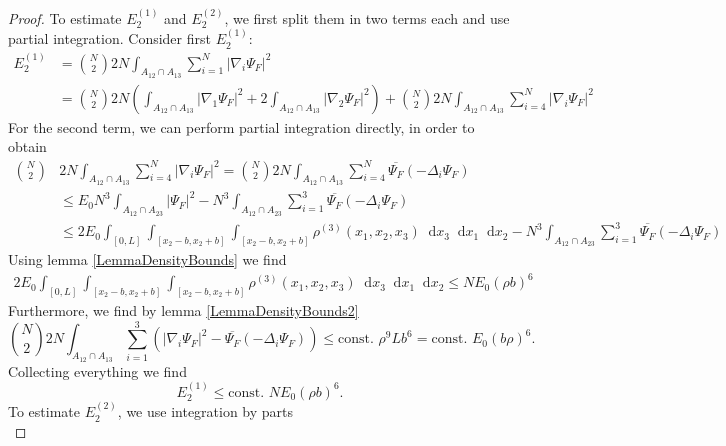 \documentclass[a4paper,11pt]{article}
\newcommand{\abs}[1]{\left\lvert #1 \right\rvert}
\newcommand*\diff{\mathop{}\!\mathrm{d}}
\numberwithin{equation}{section}
\begin{document}
		\begin{proof}
		To estimate $ E_2^{(1)} $ and $ E_2^{(2)} $, we first split them in two terms each and use partial integration. Consider first $ E_2^{(1)} $: 
		\begin{equation}
		\begin{aligned}
		E_2^{(1)}&=\binom{N}{2}2N\int_{A_{12}\cap A_{13}}\sum_{i=1}^{N}\abs{\nabla_i\Psi_F}^2\\
		&=\binom{N}{2}2N\left(\int_{A_{12}\cap A_{13}}\abs{\nabla_1\Psi_F}^2+2\int_{A_{12}\cap A_{13}}\abs{\nabla_2\Psi_F}^2\right)+\binom{N}{2}2N\int_{A_{12}\cap A_{13}}\sum_{i=4}^{N}\abs{\nabla_i\Psi_F}^2
		\end{aligned}
		\end{equation}
		For the second term, we can perform partial integration directly, in order to obtain \begin{equation}
		\begin{aligned}
		\binom{N}{2}&2N\int_{A_{12}\cap A_{13}}\sum_{i=4}^{N}\abs{\nabla_i\Psi_F}^2=\binom{N}{2}2N\int_{A_{12}\cap A_{13}}\sum_{i=4}^{N}\overline{\Psi_F}(-\Delta_i\Psi_F)\\
		&\leq E_0 N^3\int_{A_{12}\cap A_{23}}\abs{\Psi_F}^2-N^3\int_{A_{12}\cap A_{23}}\sum_{i=1}^{3}\overline{\Psi_F}(-\Delta_i\Psi_F)\\&\leq 2E_0\int_{[0,L]}\int_{[x_2-b,x_2+b]}\int_{[x_2-b,x_2+b]}\rho^{(3)}(x_1,x_2,x_3)\diff x_3\diff x_1\diff x_2-N^3\int_{A_{12}\cap A_{23}}\sum_{i=1}^{3}\overline{\Psi_F}(-\Delta_i\Psi_F)
		\end{aligned}
		\end{equation}
		Using lemma \ref{LemmaDensityBounds} we find \begin{equation}
		\begin{aligned}
		2E_0\int_{[0,L]}\int_{[x_2-b,x_2+b]}\int_{[x_2-b,x_2+b]}\rho^{(3)}(x_1,x_2,x_3)\diff x_3\diff x_1\diff x_2\leq NE_0(\rho b)^6
		\end{aligned}
		\end{equation}
		Furthermore, we find by lemma \ref{LemmaDensityBounds2} \begin{equation}
		\binom{N}{2}2N\int_{A_{12}\cap A_{13}}\sum_{i=1}^{3}\left(\abs{\nabla_i\Psi_F}^2-\overline{\Psi_F}(-\Delta_i\Psi_F)\right)\leq \text{const. }\rho^9 L b^6=\text{const. }E_0 (b\rho)^6.
		\end{equation}
		Collecting everything we find \begin{equation}
		E_2^{(1)}\leq \text{const. }NE_0(\rho b)^6.
		\end{equation}
		To estimate $ E_2^{(2)} $, we use integration by parts\begin{equation}

\end{equation}
\end{proof}
\end{document}
